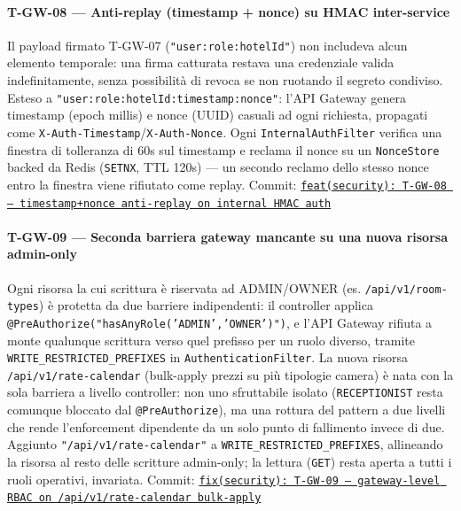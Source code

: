 ﻿\documentclass[a4paper,12pt]{report}
\newcommand{\commitref}[2]{\texttt{\small \href{https://github.com/diegoandruccioli/hotel-pms/commit/#1}{#2}}}
\begin{document}
\paragraph{T-GW-08 --- Anti-replay (timestamp + nonce) su HMAC inter-service}
Il payload firmato T-GW-07 (\texttt{"user:role:hotelId"}) non includeva alcun elemento
temporale: una firma catturata restava una credenziale valida indefinitamente, senza
possibilità di revoca se non ruotando il segreto condiviso. Esteso a
\texttt{"user:role:hotelId:timestamp:nonce"}: l'API Gateway genera timestamp
(epoch millis) e nonce (UUID) casuali ad ogni richiesta, propagati come
\texttt{X-Auth-Timestamp}/\texttt{X-Auth-Nonce}. Ogni \texttt{InternalAuthFilter} verifica
una finestra di tolleranza di 60s sul timestamp e reclama il nonce su un
\texttt{NonceStore} backed da Redis (\texttt{SETNX}, TTL 120s) — un secondo reclamo dello
stesso nonce entro la finestra viene rifiutato come replay.
Commit: \commitref{5dd8ed8}{feat(security): T-GW-08 --- timestamp+nonce anti-replay on internal HMAC auth}

\paragraph{T-GW-09 --- Seconda barriera gateway mancante su una nuova risorsa admin-only}
Ogni risorsa la cui scrittura è riservata ad ADMIN/OWNER (es. \texttt{/api/v1/room-types})
è protetta da due barriere indipendenti: il controller applica
\texttt{@PreAuthorize("hasAnyRole('ADMIN','OWNER')")}, e l'API Gateway rifiuta a monte
qualunque scrittura verso quel prefisso per un ruolo diverso, tramite
\texttt{WRITE\_RESTRICTED\_PREFIXES} in \texttt{AuthenticationFilter}. La nuova risorsa
\texttt{/api/v1/rate-calendar} (bulk-apply prezzi su più tipologie camera) è nata con la
sola barriera a livello controller: non uno sfruttabile isolato (\texttt{RECEPTIONIST}
resta comunque bloccato dal \texttt{@PreAuthorize}), ma una rottura del pattern a due
livelli che rende l'enforcement dipendente da un solo punto di fallimento invece di due.
Aggiunto \texttt{"/api/v1/rate-calendar"} a \texttt{WRITE\_RESTRICTED\_PREFIXES}, allineando
la risorsa al resto delle scritture admin-only; la lettura (\texttt{GET}) resta aperta a
tutti i ruoli operativi, invariata.
Commit: \commitref{2bf58be}{fix(security): T-GW-09 --- gateway-level RBAC on /api/v1/rate-calendar bulk-apply}
\end{document}
